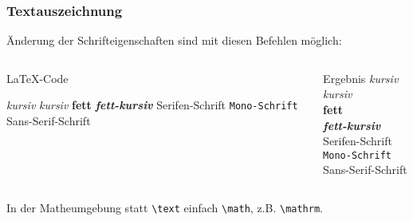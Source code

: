 \begin{frame}[fragile]
    \frametitle{Textauszeichnung}
    Änderung der Schrifteigenschaften sind mit diesen Befehlen möglich:
    \begin{columns}[t]
        \begin{column}{0.6\textwidth}
            \begin{block}{\LaTeX-Code}
                \begin{lstverbatim}
                \textit{kursiv} \emph{kursiv}
                \textbf{fett}
                \textbf{\textit{fett-kursiv}}
                \textrm{Serifen-Schrift}
                \texttt{Mono-Schrift}
                \textsf{Sans-Serif-Schrift}
                \end{lstverbatim}
            \end{block}
        \end{column}
        \begin{column}{0.35\textwidth}
            \begin{block}{Ergebnis}
                \textit{kursiv} \emph{kursiv} \\
                \textbf{fett} \\
                \textbf{\textit{fett-kursiv}} \\
                \textrm{Serifen-Schrift} \\
                \texttt{Mono-Schrift} \\
                \textsf{Sans-Serif-Schrift}
            \end{block}
        \end{column}
    \end{columns}
    \vspace{1em}
In der Matheumgebung statt \verb+\text+ einfach \verb+\math+, z.B.  \verb+\mathrm+.
\end{frame}

